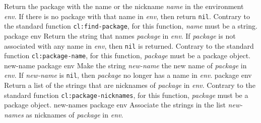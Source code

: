 \vskip -0.2cm
Return the package with the name or the nickname \textit{name} in the
environment \textit{env}.  If there is no package with that name
in \textit{env}, then return \texttt{nil}.  Contrary to
the standard \commonlisp{} function \texttt{cl:find-package}, for this
function, \textit{name} must be a string.
\vskip -0.02cm
 {package env}
\vskip -0.2cm
Return the string that names \textit{package} in \textit{env}.
If \textit{package} is not associated with any name in \textit{env},
then \texttt{nil} is returned.  Contrary to the standard \commonlisp{}
function \texttt{cl:package-name}, for this function, \textit{package}
must be a package object.
\vskip -0.02cm
 {new-name package env}
\vskip -0.2cm
Make the string \textit{new-name} the new name of \textit{package}
in \textit{env}.  If \textit{new-name} is \texttt{nil},
then \textit{package} no longer has a name in \textit{env}.
\vskip -0.02cm
 {package env}
\vskip -0.2cm
Return a list of the strings that are nicknames of \textit{package}
in \textit{env}.  Contrary to the standard \commonlisp{}
function \texttt{cl:package-nicknames}, for this function, \textit{package}
must be a package object.
\vskip -0.02cm
 {new-names package env}
\vskip -0.2cm
Associate the strings in the list \textit{new-names} as nicknames
of \textit{package} in \textit{env}.
